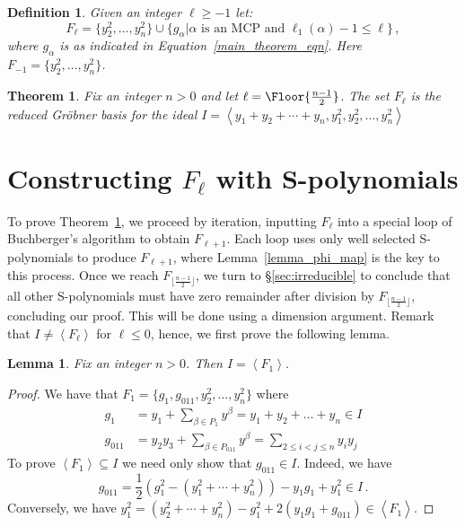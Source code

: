 \documentclass[10pt,a4paper]{article}
\newtheorem{lemma}{Lemma}[section]
\newtheorem{definition}{Definition}[section]
\newtheorem{theorem}{Theorem}[section]
\DeclarePairedDelimiter\Floor\lfloor\rfloor
\DeclareMathOperator{\la}{\langle}
\DeclareMathOperator{\ra}{\rangle}
\DeclareMathOperator{\sube}{\subseteq}
\begin{document}
\begin{definition} \label{F_ell}
	Given an integer $\ell \ge -1$ let:
	\begin{equation*}
		F_\ell = \big\{ y^2_2, \dots, y^2_n\big\} \cup \big\{ g_{\alpha} \big|  \alpha \text{ is an MCP and } \ell_1(\alpha)-1 \leq \ell \big\} \,,
	\end{equation*}
	where $g_\alpha$ is as indicated in Equation~\eqref{main_theorem_eqn}. Here $F_{-1}= \big\{ y^2_2, \dots, y^2_n\big\}$.
\end{definition}
\begin{theorem} 
\label{main_theorem2}
    Fix an integer $n>0$ and let $\ell = \Floor{\frac{n-1}{2}}$. The set $F_\ell$ is the reduced Gr\"obner basis for the ideal $I = \la y_1 + y_2 + \cdots + y_n, y_1^2, y_2^2, \dots, y_n^2 \ra$
    \end{theorem}

\section{\label{proof}Constructing $F_\ell$ with S-polynomials}
To prove Theorem~\ref{main_theorem2}, we proceed by iteration, inputting $F_\ell$ into a special loop of Buchberger's algorithm to obtain $F_{\ell +1}$.
Each loop uses only well selected  S-polynomials to produce $F_{\ell +1}$, where Lemma~\ref{lemma_phi_map} is the key to this process.
Once we reach $F_{ \lfloor \frac{n-1}{2} \rfloor}$, we turn to  \S\ref{sec:irreducible} to conclude that all other S-polynomials must have zero remainder  after division by $F_{ \lfloor \frac{n-1}{2} \rfloor}$, concluding our proof. This will be done using a dimension argument.
Remark that $I\ne \la F_\ell \ra$ for $\ell\le 0$, hence, we first prove the following lemma.
\begin{lemma} \label{F_ellsequence}
	Fix an integer $n>0$. Then $I=\la F_1\ra$.
\end{lemma}
\begin{proof} We have that $F_1 = \{g_1, g_{011}, y_2^2, \dots, y_n^2 \}$ where
 	\begin{align*}
 		g_{1} &= y_1 + \sum_{\beta \in P_{1}} y^{\beta} = y_1 + y_2 + \dots + y_n \in I\\
 		g_{011} &= y_2y_3 + \sum_{\beta \in P_{011}}y^\beta = \sum_{2 \leq i < j \leq n}y_iy_j 
	\end{align*}
	To prove {$\la F_1 \ra \sube I $} we need only show that $g_{011} \in I$. Indeed, we have
	$$  g_{011} = \frac{1}{2}(g_1^2 - (y_1^2 + \cdots +y_n^2)) - y_1g_1 + y_1^2  \in I\,.$$
	Conversely, we have   $ y_1^2 =(y_2^2 + \cdots +y_n^2) -g_1^2  + 2(y_1g_1 + g_{011}) \in \la F_1 \ra$.
\end{proof}
\end{document}
